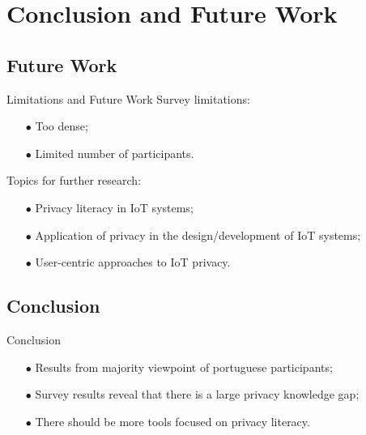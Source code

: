 \documentclass[xcolor={svgnames},compress,aspectratio=169]{beamer}
\begin{document}

\section{Conclusion and Future Work}

\subsection{Future Work}

\begin{frame}{Limitations and Future Work}
    Survey limitations:
    \begin{itemize}
        \item[$\bullet$]
        Too dense;
        \item[$\bullet$]
        Limited number of participants.
    \end{itemize}
    Topics for further research:
    \begin{itemize}
        \item[$\bullet$]
        Privacy literacy in IoT systems;
        \item[$\bullet$]
        Application of privacy in the design/development of IoT systems;
        \item[$\bullet$]
        User-centric approaches to IoT privacy.
    \end{itemize}
\end{frame}


\subsection{Conclusion}

\begin{frame}{Conclusion}
    \begin{itemize}
        \item[$\bullet$]
        Results from majority viewpoint of portuguese participants;
        \item[$\bullet$]
        Survey results reveal that there is a large privacy knowledge gap;
        \item[$\bullet$]
        There should be more tools focused on privacy literacy.
    \end{itemize}
\end{frame}

\end{document}
